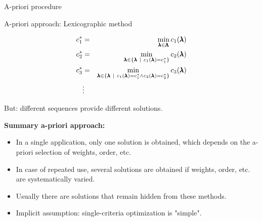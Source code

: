 \begin{frame}[allowframebreaks]{A-priori procedure}
\framebreak

A-priori approach: Lexicographic method

\begin{eqnarray*}
c_1^* &=& \min_{\pmb{\lambda} \in \pmb{\Lambda}} c_1(\pmb{\lambda})\\
c_2^* &=& \min_{\pmb{\lambda} \in \{\pmb{\lambda} ~|~ c_1(\pmb{\lambda}) = c_1^*\}} c_2(\pmb{\lambda}) \\
c_3^* &=& \min_{\pmb{\lambda} \in \{\pmb{\lambda} ~|~ c_1(\pmb{\lambda}) = c_1^* \land c_2(\pmb{\lambda}) = c_2^*\}} c_3(\pmb{\lambda}) \\
&\vdots&
\end{eqnarray*}

But: different sequences provide different solutions.

\framebreak

\textbf{Summary a-priori approach:}
\begin{itemize}
\item In a single application, only one solution is obtained, which depends on the a-priori selection of weights, order, etc.
\item In case of repeated use, several solutions are obtained if weights, order, etc. are systematically varied.
\item Usually there are solutions that remain hidden from these methods.
\item Implicit assumption: single-criteria optimization is "simple".
\end{itemize}

\end{frame}

